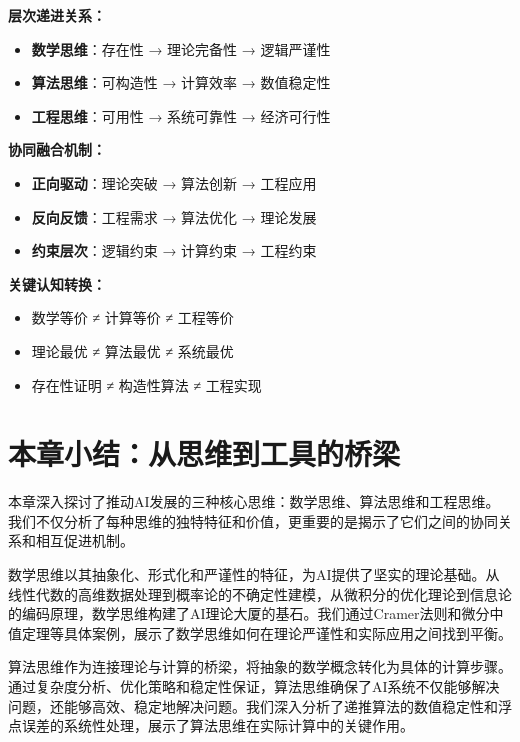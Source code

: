 \begin{tcolorbox}[colback=blue!5!white,colframe=blue!75!black,title=核心要点：三种思维的层次递进与协同融合]
\textbf{层次递进关系：}
\begin{itemize}
\item \textbf{数学思维}：存在性 → 理论完备性 → 逻辑严谨性
\item \textbf{算法思维}：可构造性 → 计算效率 → 数值稳定性  
\item \textbf{工程思维}：可用性 → 系统可靠性 → 经济可行性
\end{itemize}

\textbf{协同融合机制：}
\begin{itemize}
\item \textbf{正向驱动}：理论突破 → 算法创新 → 工程应用
\item \textbf{反向反馈}：工程需求 → 算法优化 → 理论发展
\item \textbf{约束层次}：逻辑约束 → 计算约束 → 工程约束
\end{itemize}

\textbf{关键认知转换：}
\begin{itemize}
\item 数学等价 ≠ 计算等价 ≠ 工程等价
\item 理论最优 ≠ 算法最优 ≠ 系统最优
\item 存在性证明 ≠ 构造性算法 ≠ 工程实现
\end{itemize}
\end{tcolorbox}


\section{本章小结：从思维到工具的桥梁}

本章深入探讨了推动AI发展的三种核心思维：数学思维、算法思维和工程思维。我们不仅分析了每种思维的独特特征和价值，更重要的是揭示了它们之间的协同关系和相互促进机制。

数学思维以其抽象化、形式化和严谨性的特征，为AI提供了坚实的理论基础。从线性代数的高维数据处理到概率论的不确定性建模，从微积分的优化理论到信息论的编码原理，数学思维构建了AI理论大厦的基石。我们通过Cramer法则和微分中值定理等具体案例，展示了数学思维如何在理论严谨性和实际应用之间找到平衡。

算法思维作为连接理论与计算的桥梁，将抽象的数学概念转化为具体的计算步骤。通过复杂度分析、优化策略和稳定性保证，算法思维确保了AI系统不仅能够解决问题，还能够高效、稳定地解决问题。我们深入分析了递推算法的数值稳定性和浮点误差的系统性处理，展示了算法思维在实际计算中的关键作用。

